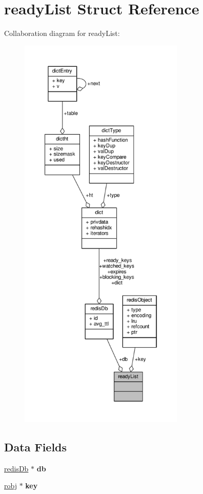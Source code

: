 \hypertarget{structreadyList}{}\section{ready\+List Struct Reference}
\label{structreadyList}


Collaboration diagram for ready\+List\+:\nopagebreak
\begin{figure}[H]
\begin{center}
\leavevmode
\includegraphics[height=550pt]{structreadyList__coll__graph}
\end{center}
\end{figure}
\subsection*{Data Fields}
\begin{DoxyCompactItemize}
\item 
\mbox{\label{structreadyList_a8d62a9f1fc62dd80e2558706860d3244}} 
\hyperlink{structredisDb}{redis\+Db} $\ast$ {\bfseries db}
\item 
\mbox{\label{structreadyList_aae64208f03c915b39706b8f9837007d2}} 
\hyperlink{structredisObject}{robj} $\ast$ {\bfseries key}
\end{DoxyCompactItemize}


